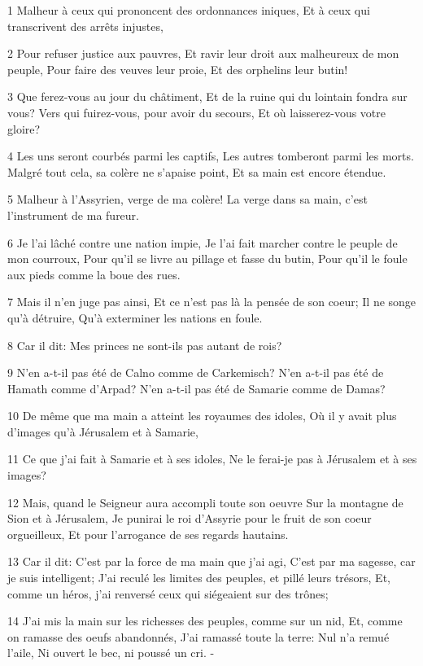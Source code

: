 \par 1 Malheur à ceux qui prononcent des ordonnances iniques, Et à ceux qui transcrivent des arrêts injustes,
\par 2 Pour refuser justice aux pauvres, Et ravir leur droit aux malheureux de mon peuple, Pour faire des veuves leur proie, Et des orphelins leur butin!
\par 3 Que ferez-vous au jour du châtiment, Et de la ruine qui du lointain fondra sur vous? Vers qui fuirez-vous, pour avoir du secours, Et où laisserez-vous votre gloire?
\par 4 Les uns seront courbés parmi les captifs, Les autres tomberont parmi les morts. Malgré tout cela, sa colère ne s'apaise point, Et sa main est encore étendue.
\par 5 Malheur à l'Assyrien, verge de ma colère! La verge dans sa main, c'est l'instrument de ma fureur.
\par 6 Je l'ai lâché contre une nation impie, Je l'ai fait marcher contre le peuple de mon courroux, Pour qu'il se livre au pillage et fasse du butin, Pour qu'il le foule aux pieds comme la boue des rues.
\par 7 Mais il n'en juge pas ainsi, Et ce n'est pas là la pensée de son coeur; Il ne songe qu'à détruire, Qu'à exterminer les nations en foule.
\par 8 Car il dit: Mes princes ne sont-ils pas autant de rois?
\par 9 N'en a-t-il pas été de Calno comme de Carkemisch? N'en a-t-il pas été de Hamath comme d'Arpad? N'en a-t-il pas été de Samarie comme de Damas?
\par 10 De même que ma main a atteint les royaumes des idoles, Où il y avait plus d'images qu'à Jérusalem et à Samarie,
\par 11 Ce que j'ai fait à Samarie et à ses idoles, Ne le ferai-je pas à Jérusalem et à ses images?
\par 12 Mais, quand le Seigneur aura accompli toute son oeuvre Sur la montagne de Sion et à Jérusalem, Je punirai le roi d'Assyrie pour le fruit de son coeur orgueilleux, Et pour l'arrogance de ses regards hautains.
\par 13 Car il dit: C'est par la force de ma main que j'ai agi, C'est par ma sagesse, car je suis intelligent; J'ai reculé les limites des peuples, et pillé leurs trésors, Et, comme un héros, j'ai renversé ceux qui siégeaient sur des trônes;
\par 14 J'ai mis la main sur les richesses des peuples, comme sur un nid, Et, comme on ramasse des oeufs abandonnés, J'ai ramassé toute la terre: Nul n'a remué l'aile, Ni ouvert le bec, ni poussé un cri. -
